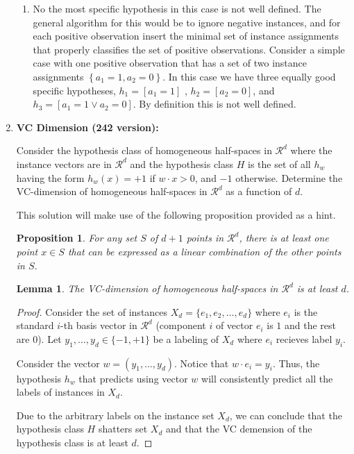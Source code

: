 \documentclass[12pt]{article}
\newtheorem{lemma}{Lemma}[section]
\newtheorem{proposition}{Proposition}[section]
\begin{document}
\begin{enumerate}
\begin{enumerate}
\item No the most specific hypothesis in this case is not well defined.
The general algorithm for this would be to ignore negative instances,
and for each positive observation insert the minimal set of instance
assignments that properly classifies the set of positive observations.
Consider a simple case with one positive observation that has a set
of two instance assignments $\left\{ a_{1}=1,a_{2}=0\right\} $. In
this case we have three equally good specific hypotheses, $h_{1}=\left[a_{1}=1\right]$
, $h_{2}=\left[a_{2}=0\right]$, and $h_{3}=\left[a_{1}=1\vee a_{2}=0\right]$.
By definition this is not well defined.
\end{enumerate}


\item \textbf{VC Dimension (242 version): }

Consider the hypothesis class of homogeneous half-spaces in $\mathcal{R}^d$ where the instance vectors are in $\mathcal{R}^d$ and the hypothesis class $H$ is the set of all $h_w$ having the form $h_w(x) = +1$ if $w \cdot x > 0$, and $-1$ otherwise.
Determine the VC-dimension of homogeneous half-spaces in $\mathcal{R}^d$ as a function of $d$.

This solution will make use of the following proposition provided as a hint.
\begin{proposition}
    \label{prop:lin-comb}
    For any set $S$ of $d+1$ points in $\mathcal{R}^d$, there is at least one point $x \in S$ that can be expressed as a linear combination of the other points in $S$.
\end{proposition}

\begin{lemma}
    The VC-dimension of homogeneous half-spaces in $\mathcal{R}^d$ is at least $d$.
\end{lemma}

\begin{proof}
    Consider the set of instances $X_d = \{e_1, e_2, \dots, e_d\}$ where $e_i$ is the standard $i$-th basis vector in $\mathcal{R}^d$ (component $i$ of vector $e_i$ is $1$ and the rest are $0$).
    Let $y_1, \dots, y_d \in \{-1,+1\}$ be a labeling of $X_d$ where $e_i$ recieves label $y_i$.

    Consider the vector $w = (y_1, \dots, y_d)$.
    Notice that $w \cdot e_i = y_i$.
    Thus, the hypothesis $h_w$ that predicts using vector $w$ will consistently predict all the labels of instances in $X_d$.

    Due to the arbitrary labels on the instance set $X_d$, we can conclude that the hypothesis class $H$ shatters set $X_d$ and that the VC demension of the hypothesis class is at least $d$.
\end{proof}


\end{enumerate}
\end{document}

